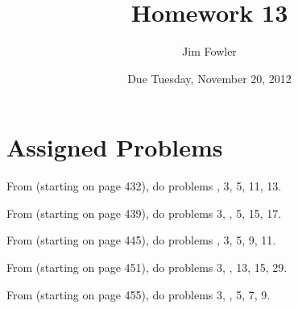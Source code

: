 \documentclass[12pt]{handout}
\title{Homework 13}
\date{Due Tuesday, November 20, 2012}
\author{Jim Fowler}
\begin{document}
\maketitle











\section*{Assigned Problems}

From  (starting on page 432),
do problems , 3, 5, 11, 13.
\vspace{1ex}

From  (starting on page 439),
do problems 3, , 5, 15, 17.
\vspace{1ex}

From  (starting on page 445),
do problems , 3, 5, 9, 11.
\vspace{1ex}

From  (starting on page 451),
do problems 3, , 13, 15, 29.
\vspace{1ex}

From  (starting on page 455),
do problems 3, , 5, 7, 9.
\vspace{1ex}
\end{document}

